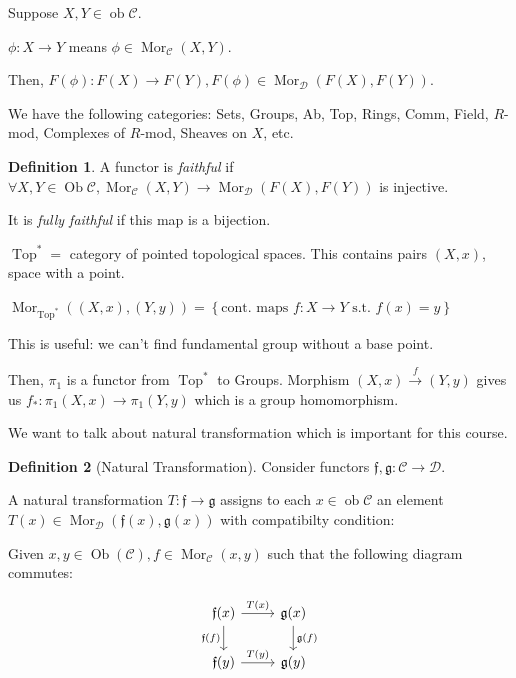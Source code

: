 \documentclass{article}
\theoremstyle{definition}
\newtheorem*{definition}{Definition}
\begin{document}
    Suppose \(X,Y\in \operatorname{ob} \mathcal{C}\).

    \(\phi: X \to Y\) means \(\phi \in \operatorname{Mor}_{\mathcal{C}}(X,Y)\).
    
    Then, \(F(\phi): F(X) \to F(Y), F(\phi)\in \operatorname{Mor}_{\mathcal{D}}(F(X),F(Y))\). 

    We have the following categories: Sets, Groups, Ab, Top, Rings, Comm, Field, \(R\)-mod, Complexes of \(R\)-mod, Sheaves on \(X\), etc.

    \begin{definition}
        A functor is \textit{faithful} if \(\forall X,Y\in \operatorname{Ob} \mathcal{C}, \operatorname{Mor}_{\mathcal{C}} (X,Y) \to \operatorname{Mor}_{\mathcal{D}}(F(X),F(Y))\) is injective.

        It is \textit{fully faithful} if this map is a bijection.
    \end{definition}

    \(\operatorname{Top} ^{\ast} =\) category of pointed topological spaces. This contains pairs \((X,x)\), space with a point.
    
    \(\operatorname{Mor}_{\operatorname{Top}^{\ast}}\left( (X,x),(Y,y) \right) = \left\{ \text{cont. maps } f: X\to Y \text{ s.t. } f(x) = y \right\}\)

    This is useful: we can't find fundamental group without a base point.

    Then, \(\pi_1\) is a functor from \(\operatorname{Top}^{\ast}\) to Groups. Morphism \((X,x) \xrightarrow{f} (Y,y)\) gives us \(f_{\ast} : \pi_1(X,x) \to \pi_1(Y,y)\) which is a group homomorphism.

    We want to talk about natural transformation which is important for this course.

    \begin{definition}
        [Natural Transformation] Consider functors \(\mathfrak{f},\mathfrak{g}: \mathcal{C} \to \mathcal{D}\).

        A natural transformation \(T: \mathfrak{f} \to \mathfrak{g}\) assigns to each \(x \in \operatorname{ob} \mathcal{C}\) an element \(T(x) \in \operatorname{Mor}_{\mathcal{D}} (\mathfrak{f}(x), \mathfrak{g}(x))\) with compatibilty condition:

        Given \(x,y\in \operatorname{Ob} (\mathcal{C}), f\in \operatorname{Mor}_{\mathcal{C}}(x,y)\) such that the following diagram commutes:

        \[
            \begin{tikzcd}
                \mathfrak{f} (x) \ar[r,"T(x)"] \ar[d,"\mathfrak{f}(f)"'] & \mathfrak{g}(x) \ar[d,"\mathfrak{g}(f)"] \\ \mathfrak{f}(y) \ar[r,"T(y)"] & \mathfrak{g}(y) 
            \end{tikzcd}
        \]
    \end{definition}
\end{document}

